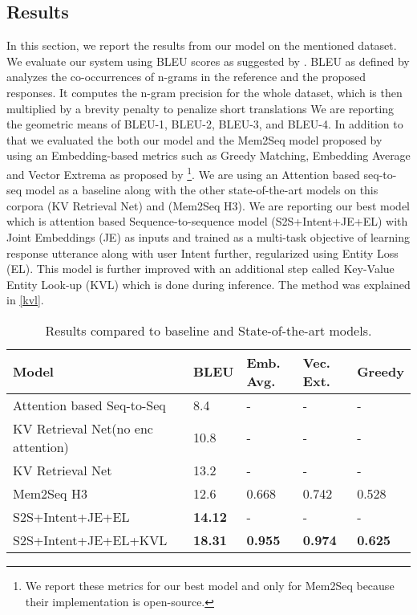 \documentclass[runningheads]{llncs}
\begin{document}
\subsection{Results}
In this section, we report the results from our model on the mentioned dataset. We evaluate our system using BLEU scores as suggested by \cite{papineni2002bleu}. BLEU as defined by \cite{papineni2002bleu} analyzes the co-occurrences of n-grams in the reference and the proposed responses. It computes the n-gram precision for the whole dataset, which is then multiplied by a brevity penalty to penalize short translations We are reporting the geometric means of BLEU-1, BLEU-2, BLEU-3, and BLEU-4. In addition to that we evaluated the both our model and the Mem2Seq model proposed by \cite{P18-1136} using an Embedding-based metrics such as Greedy Matching, Embedding Average and Vector Extrema as proposed by \cite{liu2016not} \footnote{We report these metrics for our best model and only for Mem2Seq because their implementation is open-source.}. 
We are using an Attention based seq-to-seq model as a baseline along with the other state-of-the-art models on this corpora \cite{eric-manning:2017:SIGDIAL} (KV Retrieval Net) and \cite{P18-1136} (Mem2Seq H3). We are reporting our best model which is attention based Sequence-to-sequence model (S2S+Intent+JE+EL) with Joint Embeddings (JE) as inputs and trained as a multi-task objective of learning response utterance along with user Intent further, regularized using Entity Loss (EL). This model is further improved with an additional step called Key-Value Entity Look-up (KVL) which is done during inference. The method was explained in \ref{kvl}.


\begin{table*}[ht]
\centering
\caption{Results compared to baseline and State-of-the-art models.}
    \begin{tabular}{l|l|l|l|l}
    \toprule
\textbf{Model} &  \textbf{BLEU}  &  \textbf{Emb. Avg.} &  \textbf{Vec. Ext.} &  \textbf{Greedy}\\
    \hline
        Attention based Seq-to-Seq  & 8.4 & - & - & -  \\
    \hline
        KV Retrieval Net(no enc attention)  &  10.8 & - & - & - \\
        KV Retrieval Net &  13.2 & - & - & - \\
        Mem2Seq H3 & 12.6 & 0.668 & 0.742 & 0.528 \\
    \hline
        S2S+Intent+JE+EL &  \textbf{14.12} & - & - & - \\
        S2S+Intent+JE+EL+KVL &  \textbf{18.31} & \textbf{0.955} & \textbf{0.974} & \textbf{0.625} \\
\bottomrule
    \end{tabular}
     \vspace{0.1cm}
    \label{tab:eval}
\end{table*}
\end{document}
